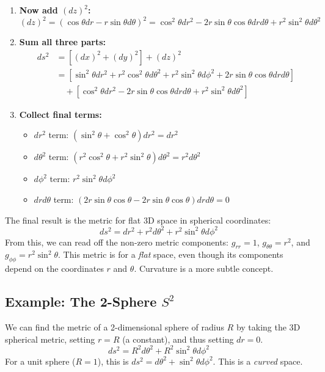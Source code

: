 \documentclass[11pt, a4paper]{report}
\begin{document}
\begin{enumerate}
    \item \textbf{Now add $(dz)^2$:}
    \[
        (dz)^2 = (\cos\theta dr - r\sin\theta d\theta)^2 = \cos^2\theta dr^2 - 2r\sin\theta\cos\theta dr d\theta + r^2\sin^2\theta d\theta^2
    \]
    \item \textbf{Sum all three parts:}
    \begin{align*}
        ds^2 &= \left[ (dx)^2 + (dy)^2 \right] + (dz)^2 \\
             &= \left[ \sin^2\theta dr^2 + r^2\cos^2\theta d\theta^2 + r^2\sin^2\theta d\phi^2 + 2r\sin\theta\cos\theta dr d\theta \right] \\
             & \quad + \left[ \cos^2\theta dr^2 - 2r\sin\theta\cos\theta dr d\theta + r^2\sin^2\theta d\theta^2 \right]
    \end{align*}
    \item \textbf{Collect final terms:}
    \begin{itemize}
        \item $dr^2$ term: $(\sin^2\theta + \cos^2\theta)dr^2 = dr^2$
        \item $d\theta^2$ term: $(r^2\cos^2\theta + r^2\sin^2\theta)d\theta^2 = r^2 d\theta^2$
        \item $d\phi^2$ term: $r^2\sin^2\theta d\phi^2$
        \item $dr d\theta$ term: $(2r\sin\theta\cos\theta - 2r\sin\theta\cos\theta) dr d\theta = 0$
    \end{itemize}
\end{enumerate}
The final result is the metric for flat 3D space in spherical coordinates:
\begin{equation}
    ds^2 = dr^2 + r^2 d\theta^2 + r^2\sin^2\theta d\phi^2
\end{equation}
From this, we can read off the non-zero metric components: $g_{rr}=1$, $g_{\theta\theta}=r^2$, and $g_{\phi\phi}=r^2\sin^2\theta$. This metric is for a \emph{flat} space, even though its components depend on the coordinates $r$ and $\theta$. Curvature is a more subtle concept.

\subsection*{Example: The 2-Sphere $S^2$}
We can find the metric of a 2-dimensional sphere of radius $R$ by taking the 3D spherical metric, setting $r=R$ (a constant), and thus setting $dr=0$.
\begin{equation}
    ds^2 = R^2 d\theta^2 + R^2\sin^2\theta d\phi^2
\end{equation}
For a unit sphere ($R=1$), this is $ds^2 = d\theta^2 + \sin^2\theta d\phi^2$. This is a \emph{curved} space.
%
%
%
%
%
%
%
%
%
%
%
\end{document}
